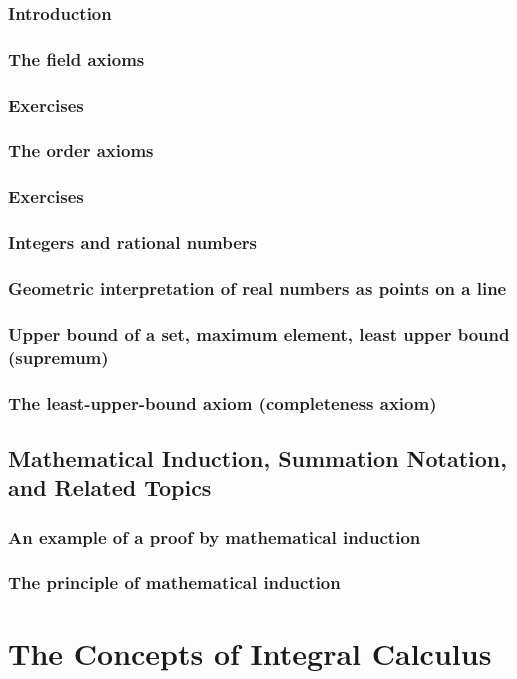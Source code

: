 \documentclass[cn,11pt,chinese]{elegantbook}
\numberwithin{equation}{section}
\begin{document}
\subsection{Introduction}


\subsection{The field axioms}


\subsection{Exercises}


\subsection{The order axioms}


\subsection{Exercises}


\subsection{Integers and rational numbers}



\subsection{Geometric interpretation of real numbers as points on a line}


\subsection{Upper bound of a set, maximum element, least upper bound (supremum)}


\subsection{The least-upper-bound axiom (completeness axiom)}



\section{Mathematical Induction, Summation Notation, and Related Topics}\label{section00104}

\subsection{An example of a proof by mathematical induction}\label{section0010401}



\subsection{The principle of mathematical induction}\label{section0010402}


\chapter{The Concepts of Integral Calculus}\label{chapter002}








% 

\appendix
\end{document}
